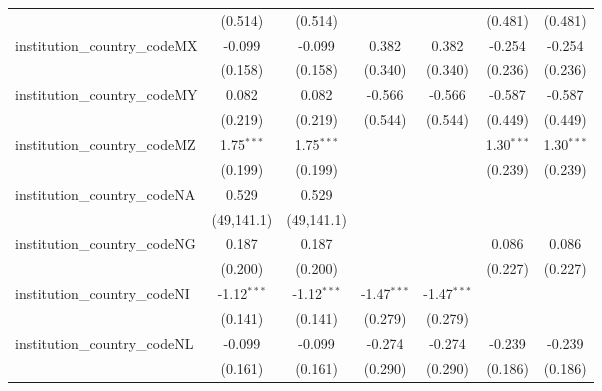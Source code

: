 \begin{tabular}{lcccccc}
                                         & (0.514)        & (0.514)        &                &                & (0.481)        & (0.481)\\   
   institution\_country\_codeMX          & -0.099         & -0.099         & 0.382          & 0.382          & -0.254         & -0.254\\   
                                         & (0.158)        & (0.158)        & (0.340)        & (0.340)        & (0.236)        & (0.236)\\   
   institution\_country\_codeMY          & 0.082          & 0.082          & -0.566         & -0.566         & -0.587         & -0.587\\   
                                         & (0.219)        & (0.219)        & (0.544)        & (0.544)        & (0.449)        & (0.449)\\   
   institution\_country\_codeMZ          & 1.75$^{***}$   & 1.75$^{***}$   &                &                & 1.30$^{***}$   & 1.30$^{***}$\\   
                                         & (0.199)        & (0.199)        &                &                & (0.239)        & (0.239)\\   
   institution\_country\_codeNA          & 0.529          & 0.529          &                &                &                &   \\   
                                         & (49,141.1)     & (49,141.1)     &                &                &                &   \\   
   institution\_country\_codeNG          & 0.187          & 0.187          &                &                & 0.086          & 0.086\\   
                                         & (0.200)        & (0.200)        &                &                & (0.227)        & (0.227)\\   
   institution\_country\_codeNI          & -1.12$^{***}$  & -1.12$^{***}$  & -1.47$^{***}$  & -1.47$^{***}$  &                &   \\   
                                         & (0.141)        & (0.141)        & (0.279)        & (0.279)        &                &   \\   
   institution\_country\_codeNL          & -0.099         & -0.099         & -0.274         & -0.274         & -0.239         & -0.239\\   
                                         & (0.161)        & (0.161)        & (0.290)        & (0.290)        & (0.186)        & (0.186)\\   

\end{tabular}
